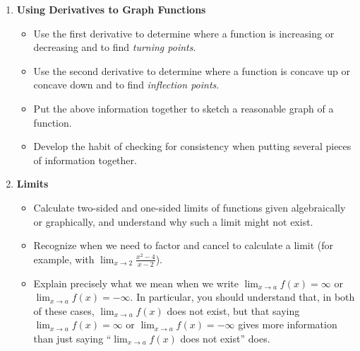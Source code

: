 \documentclass{article}
\begin{document}
\begin{enumerate}[start=8, topsep=0pt]
\begin{itemize}
\item Explain how concavity can be characterized in terms of tangent lines.

\item Explain what $f'$ and $f''$ tell us about the graph of $f$. (For example, if $f'$ is positive, what does that say about $f$? If $f'$ is increasing, what does that say about $f$?)

\item Explain how displacement, velocity, and acceleration are related in terms of derivatives.

\end{itemize}

\item \textbf{Using Derivatives to Graph Functions} %
\begin{itemize}

\item Use the first derivative to determine where a function is
  increasing or decreasing and to find \emph{turning points}.

\item Use the second derivative to determine where a function is
  concave up or concave down and to find \emph{inflection points}. 

\item Put the above information together to sketch a reasonable graph
  of a function.

\item Develop the habit of checking for consistency when putting several pieces of information together. 
\end{itemize}

\item \textbf{Limits} %
\begin{itemize}
\item Calculate two-sided and one-sided limits of functions given algebraically or graphically, and understand why such a limit might not exist.

\item Recognize when we need to factor and cancel to calculate a limit (for example, with $\displaystyle \lim_{x \to 2} \frac{x^2 - 4}{x - 2}$).

\item Explain precisely what we mean when we write $\displaystyle \lim_{x \to a} f(x) = \infty$ or $\displaystyle \lim_{x \to a} f(x) = -\infty$. In particular, you should understand that, in both of these cases, $\displaystyle \lim_{x \to a} f(x)$ does not exist, but that saying $\displaystyle \lim_{x \to a} f(x) = \infty$ or $\displaystyle \lim_{x \to a} f(x) = -\infty$ gives more information than just saying ``$\displaystyle \lim_{x \to a} f(x)$ does not exist'' does.


\end{itemize}
\end{enumerate}
\end{document}
